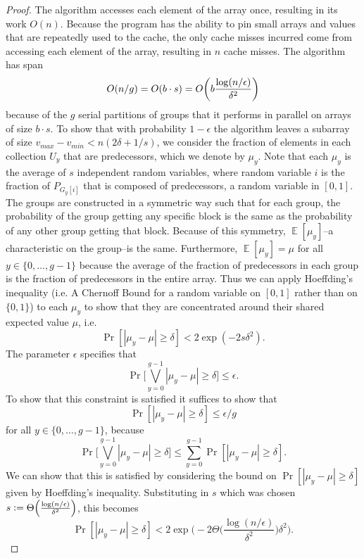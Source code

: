 \documentclass[sigconf]{acmart}
\newcommand{\defeq}{\vcentcolon=}
\DeclarePairedDelimiter{\paren}{(}{)}
\def\E{\operatorname{\mathbb{E}}}
\theoremstyle{remark}
\theoremstyle{remark}
\begin{document}
\begin{proof}
	The algorithm accesses each element of the array once, resulting in its work $O(n)$.
	Because the program has the ability to pin small arrays and values that are repeatedly used to the cache, the only cache misses incurred come from accessing each element of the array, resulting in $n$ cache misses.
	The algorithm has span $$O(n/g) = O(b\cdot s) = O\paren*{b \frac{\log (n/\epsilon)}{\delta^2}}$$
	because of the $g$ serial partitions of groups that it performs in parallel on arrays of size $b\cdot s$.
	To show that with probability $1-\epsilon$ the algorithm leaves a subarray of size $v_{max}-v_{min} < n(2\delta + 1/s)$, we consider the fraction of elements in each collection $U_y$ that are predecessors, which we denote by $\mu_y$.
	Note that each $\mu_y$ is the average of $s$ independent random variables, where random variable $i$ is the fraction of $P_{G_y[i]}$ that is composed of predecessors, a random variable in $[0, 1]$.
	The groups are constructed in a symmetric way such that for each group, the probability of the group getting any specific block is the same as the probability of any other group getting that block. 
	Because of this symmetry, $\E[\mu_y]$--a characteristic on the group--is the same.
	Furthermore, $\E[\mu_y] = \mu$ for all $y \in \{0,\ldots,g-1\}$ because the average of the fraction of predecessors in each group is the fraction of predecessors in the entire array.	
	Thus we can apply Hoeffding's inequality (i.e. A Chernoff Bound for a random variable on $[0,1]$ rather than on $\{0,1\}$) to each $\mu_y$ to show that they are concentrated around their shared expected value $\mu$, i.e.
	$$\Pr[|\mu_y - \mu| \geq \delta] < 2\exp(-2s\delta^2). $$
	The parameter $\epsilon$ specifies that 
	$$\Pr\Big[\bigvee_{y=0}^{g-1} |\mu_y - \mu| \geq \delta\Big] \leq \epsilon.$$
	To show that this constraint is satisfied it suffices to show that 
	$$\Pr[|\mu_y - \mu| \geq \delta] \leq \epsilon/g $$ for all $y\in \{0,\ldots,g-1\}$, because
	$$\Pr\Big[\bigvee_{y=0}^{g-1} |\mu_y - \mu| \geq \delta\Big] \leq \sum_{y=0}^{g-1} \Pr[|\mu_y - \mu| \geq \delta].$$
	We can show that this is satisfied by considering the bound on $\Pr[|\mu_y - \mu| \geq \delta]$ given by Hoeffding's inequality. 
	Substituting in $s$ which was chosen $s\defeq\Theta\paren*{\frac{\log (n/\epsilon)}{\delta^2}}$, this becomes
	$$\Pr[|\mu_y - \mu| \geq \delta] < 2\exp\Big(-2 \Theta\Big(\frac{\log (n/\epsilon)}{\delta^2}\Big) \delta^2\Big). $$

\end{proof}
\end{document}
